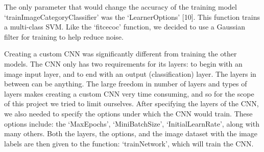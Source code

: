 \documentclass[conference]{IEEEtran}
\begin{document}
The only parameter that would change the accuracy of the training model ‘trainImageCategoryClassifier’ was the ‘LearnerOptions’ [10]. This function trains a multi-class SVM. Like the ‘fitcecoc’ function, we decided to use a Gaussian filter for training to help reduce noise. 

Creating a custom CNN was significantly different from training the other models. The CNN only has two requirements for its layers: to begin with an image input layer, and to end with an output (classification) layer. The layers in between can be anything. The large freedom in number of layers and types of layers makes creating a custom CNN very time consuming, and so for the scope of this project we tried to limit ourselves. After specifying the layers of the CNN, we also needed to specify the options under which the CNN would train. These options include: the ‘MaxEpochs’, ‘MiniBatchSize’, ‘InitialLearnRate’, along with many others. Both the layers, the options, and the image dataset with the image labels are then given to the function: ‘trainNetwork’, which will train the CNN. 
\end{document}
